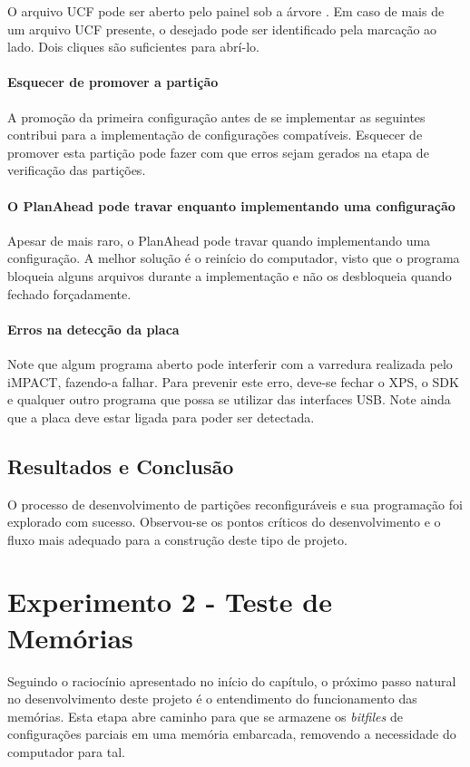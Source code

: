 \documentclass[11pt,a4paper,oneside]{book}
\begin{document}
O arquivo UCF pode ser aberto pelo painel  sob a árvore .
Em caso de mais de um arquivo UCF presente, o desejado pode ser identificado pela marcação  ao lado.
Dois cliques são suficientes para abrí-lo. 

\subsubsection{Esquecer de promover a partição}
A promoção da primeira configuração antes de se implementar as seguintes contribui para a implementação de configurações compatíveis.
Esquecer de promover esta partição pode fazer com que erros sejam gerados na etapa de verificação das partições.

\subsubsection{O PlanAhead pode travar enquanto implementando uma configuração}
Apesar de mais raro, o PlanAhead pode travar quando implementando uma configuração.
A melhor solução é o reinício do computador, visto que o programa bloqueia alguns arquivos durante a implementação e não os desbloqueia quando fechado forçadamente.


\subsubsection{Erros na detecção da placa}
Note que algum programa aberto pode interferir com a varredura realizada pelo iMPACT, fazendo-a falhar.
Para prevenir este erro, deve-se fechar o XPS, o SDK e qualquer outro programa que possa se utilizar das interfaces USB.
Note ainda que a placa deve estar ligada para poder ser detectada.

\section{Resultados e Conclusão}
O processo de desenvolvimento de partições reconfiguráveis e sua programação foi explorado com sucesso.
Observou-se os pontos críticos do desenvolvimento e o fluxo mais adequado para a construção deste tipo de projeto.

\chapter{Experimento 2 - Teste de Memórias}
Seguindo o raciocínio apresentado no início do capítulo, o próximo passo natural no desenvolvimento deste projeto é o entendimento do funcionamento das memórias.
Esta etapa abre caminho para que se armazene os \textit{bitfiles} de configurações parciais em uma memória embarcada, removendo a necessidade do computador para tal.
\end{document}
